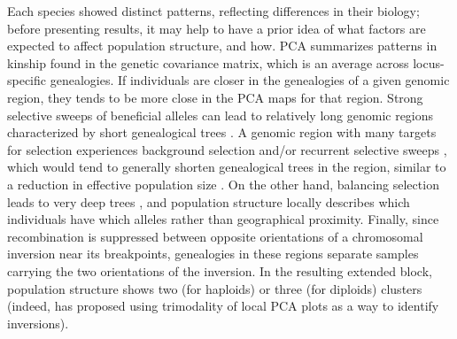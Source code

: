 \documentclass[11pt, oneside]{article}   	%
\begin{document}
Each species showed distinct patterns, reflecting differences in their biology;
before presenting results,
it may help to have a prior idea of what factors are expected to affect population structure,
and how.
PCA summarizes patterns in kinship found in the genetic covariance matrix,
which is an average across locus-specific genealogies.
If individuals are closer in the genealogies of a given genomic region, 
they tends to be more close in the PCA maps for that region. 
Strong selective sweeps of beneficial alleles can lead to relatively long genomic regions
characterized by short genealogical trees \citep{przeworski2005signature,garud2013selective}.
A genomic region with many targets for selection experiences
background selection and/or recurrent selective sweeps \citep{stephan1992effect,coop2012patterns},
which would tend to generally shorten genealogical trees in the region,
similar to a reduction in effective population size \citep{hudson1995deleterious,sattath2011pervasive}.
On the other hand, balancing selection leads to very deep trees \citep{gao2014footprints},
and population structure locally describes which individuals have which alleles
rather than geographical proximity.
Finally, 
since recombination is suppressed between opposite orientations of a chromosomal inversion
near its breakpoints,
genealogies in these regions separate samples carrying the two orientations of the inversion.
In the resulting extended block, population structure shows two (for haploids) or three (for diploids) clusters
(indeed, \citep{ma2012investigation} has proposed using trimodality of local PCA plots
as a way to identify inversions).
\end{document}
